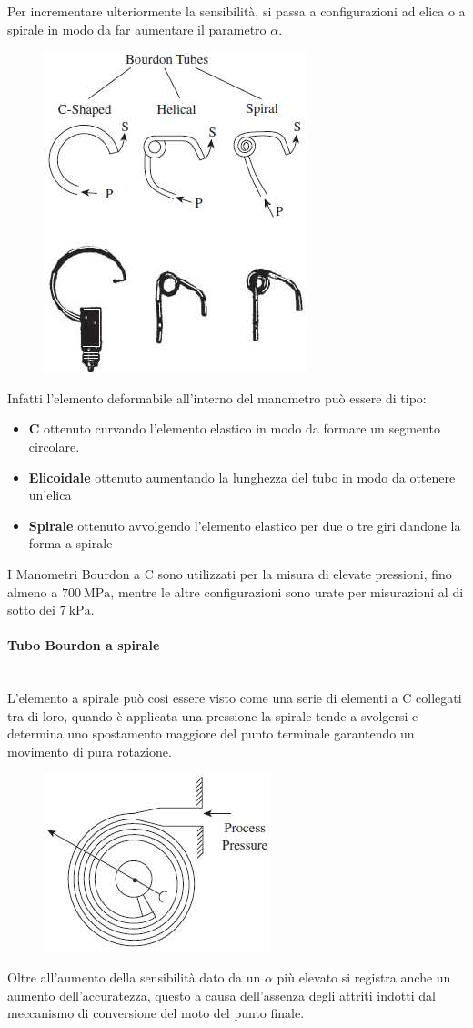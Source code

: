 \documentclass[a4paper, 15pt]{article}
\begin{document}
\begin{adjustwidth}{2in}{}
  		Per incrementare ulteriormente la sensibilità, si passa a configurazioni ad elica o a spirale in modo da far aumentare il parametro $\alpha$.  		
  		\begin{figure}[H]
  			\centering
  			\includegraphics[width=0.3\linewidth]{immagini/manometro4}
  			\label{fig:manometro4}
  		\end{figure}  		
  		Infatti l'elemento deformabile all'interno del manometro può essere di tipo:
  		\begin{itemize}
  			\item \textbf{C} ottenuto curvando l'elemento elastico in modo da formare un segmento circolare. 
  			\item \textbf{Elicoidale} ottenuto aumentando la lunghezza del tubo in modo da ottenere un'elica
  			\item \textbf{Spirale} ottenuto avvolgendo l'elemento elastico per due o tre giri dandone la forma a spirale
  		\end{itemize}
  		I Manometri Bourdon a C sono utilizzati per la misura di elevate pressioni, fino almeno a $700~\text{MPa}$, mentre le altre configurazioni sono urate per misurazioni al di sotto dei $7~\text{kPa}$.  
\newpage 		
\paragraph{Tubo Bourdon a spirale} \mbox{} \\
  		L'elemento a spirale può così essere visto come una serie di elementi a C collegati tra di loro, quando è applicata una pressione la spirale tende a svolgersi e determina uno spostamento maggiore del punto terminale garantendo un movimento di pura rotazione. 
  		\begin{figure}[H]
  			\centering
  			\includegraphics[width=0.3\linewidth]{immagini/manometro5}
  			\label{fig:manometro5}
  		\end{figure} 		
  		Oltre all'aumento della sensibilità dato da un $\alpha$ più elevato si registra anche un aumento dell'accuratezza, questo a causa dell'assenza degli attriti indotti dal meccanismo di conversione del moto del punto finale. \newline 
  		

\end{adjustwidth}
\end{document}
